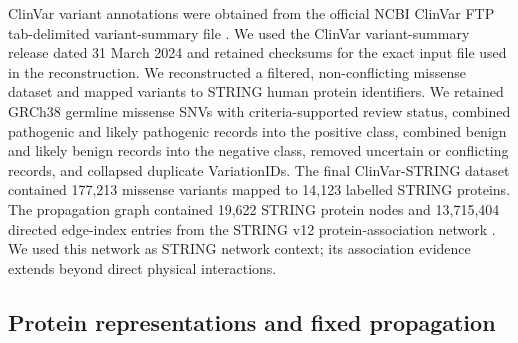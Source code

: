 \documentclass[conference]{IEEEtran}
\begin{document}
ClinVar variant annotations were obtained from the official NCBI ClinVar FTP tab-delimited variant-summary file \cite{Landrum2020ClinVar}. We used the ClinVar variant-summary release dated 31 March 2024 and retained checksums for the exact input file used in the reconstruction. We reconstructed a filtered, non-conflicting missense dataset and mapped variants to STRING human protein identifiers. We retained GRCh38 germline missense SNVs with criteria-supported review status, combined pathogenic and likely pathogenic records into the positive class, combined benign and likely benign records into the negative class, removed uncertain or conflicting records, and collapsed duplicate VariationIDs. The final ClinVar-STRING dataset contained 177,213 missense variants mapped to 14,123 labelled STRING proteins. The propagation graph contained 19,622 STRING protein nodes and 13,715,404 directed edge-index entries from the STRING v12 protein-association network \cite{Szklarczyk2023STRING}. We used this network as STRING network context; its association evidence extends beyond direct physical interactions.

\subsection{Protein representations and fixed propagation}
\end{document}
